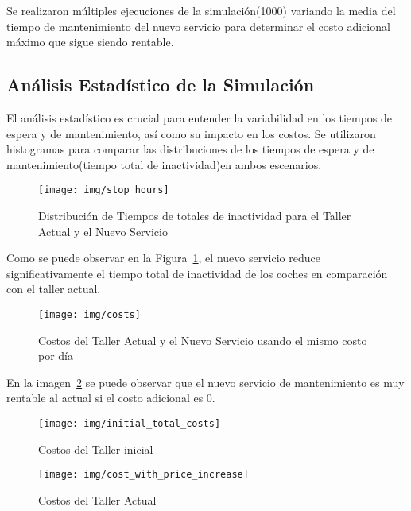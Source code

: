 Se realizaron múltiples ejecuciones de la simulación(1000) variando la media del tiempo de mantenimiento del nuevo servicio para determinar el costo adicional máximo que sigue siendo rentable.

\subsection{Análisis Estadístico de la Simulación}\label{subsec:analisis-estadistico-de-la-simulacion}

El análisis estadístico es crucial para entender la variabilidad en los tiempos de espera y de mantenimiento, así como su impacto en los costos.
Se utilizaron histogramas para comparar las distribuciones de los tiempos de espera y de mantenimiento(tiempo total de inactividad)en ambos escenarios.


\begin{figure}[H]
    \centering
    \texttt{[image: img/stop\_hours]}
    \caption{Distribución de Tiempos de totales de inactividad para el Taller Actual y el Nuevo Servicio}
    \label{fig:-tiempo_total_de_inactividad}

\end{figure}


Como se puede observar en la Figura~\ref{fig:-tiempo_total_de_inactividad}, el nuevo servicio reduce significativamente el tiempo total de inactividad de los coches en comparación con el taller actual.


\begin{figure}[H]
    \centering
    \texttt{[image: img/costs]}
    \caption{Costos del Taller Actual y el Nuevo Servicio usando el mismo costo por día}
    \label{fig:-costos-totales}
\end{figure}

En la imagen~\ref{fig:-costos-totales} se puede observar que el nuevo servicio de mantenimiento es muy rentable al actual si el costo adicional es 0.

\begin{figure}[H]
    \centering
    \begin{minipage}{0.7\textwidth}
        \centering
        \texttt{[image: img/initial\_total\_costs]}
        \caption{Costos del Taller inicial}
        \label{fig:-costo-total-inicial}
    \end{minipage}
    \begin{minipage}{0.7\textwidth}
        \centering
        \texttt{[image: img/cost\_with\_price\_increase]}
        \caption{Costos del Taller Actual}
        \label{fig:-nuevo-costo-total}
    \end{minipage}

\end{figure}


